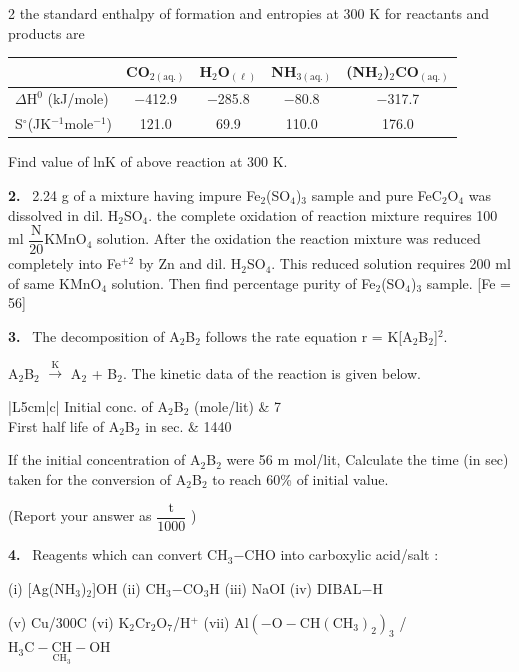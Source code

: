 \documentclass[10pt]{extarticle}
\newcommand{\qn}[1]{\par\smallskip\noindent\textbf{#1.}~}
\begin{document}
\begin{multicols}{2}
the standard enthalpy of formation and entropies at 300 K for reactants and products are\par
{\footnotesize\setlength{\tabcolsep}{2pt}\noindent\begin{tabular}{|l|c|c|c|c|}
\hline
 & CO$_{2(\text{aq.})}$ & H$_2$O$_{(\ell)}$ & NH$_{3(\text{aq.})}$ & (NH$_2$)$_2$CO$_{(\text{aq.})}$\\ \hline
$\Delta\text{H}^0$ (kJ/mole) & $-$412.9 & $-$285.8 & $-$80.8 & $-$317.7\\ \hline
S$^\circ$(JK$^{-1}$mole$^{-1}$) & 121.0 & 69.9 & 110.0 & 176.0\\ \hline
\end{tabular}}\par
Find value of lnK of above reaction at 300 K.
\qn{2} 2.24 g of a mixture having impure Fe$_2$(SO$_4$)$_3$ sample and pure FeC$_2$O$_4$ was dissolved in dil. H$_2$SO$_4$. the complete oxidation of reaction mixture requires 100 ml $\dfrac{\text{N}}{20}$KMnO$_4$ solution. After the oxidation the reaction mixture was reduced completely into Fe$^{+2}$ by Zn and dil. H$_2$SO$_4$. This reduced solution requires 200 ml of same KMnO$_4$ solution. Then find percentage purity of Fe$_2$(SO$_4$)$_3$ sample. [Fe = 56]
\qn{3} The decomposition of A$_2$B$_2$ follows the rate equation r = K[A$_2$B$_2$]$^2$.\par
A$_2$B$_2$ $\xrightarrow{\text{K}}$ A$_2$ + B$_2$. The kinetic data of the reaction is given below.\par
{\footnotesize\setlength{\tabcolsep}{2pt}\noindent\begin{tabular}{|L{5cm}|c|}
\hline
Initial conc. of A$_2$B$_2$ (mole/lit) & 7\\ \hline
First half life of A$_2$B$_2$ in sec. & 1440\\ \hline
\end{tabular}}\par
If the initial concentration of A$_2$B$_2$ were 56 m mol/lit, Calculate the time (in sec) taken for the conversion of A$_2$B$_2$ to reach 60\% of initial value.\par
(Report your answer as $\dfrac{\text{t}}{1000}$ )
\qn{4} Reagents which can convert CH$_3$$-$CHO into carboxylic acid/salt :\par
(i) [Ag(NH$_3$)$_2$]OH \quad (ii) CH$_3$$-$CO$_3$H \quad (iii) NaOI \quad (iv) DIBAL$-$H\par
(v) Cu/300\textdegree C \quad (vi) K$_2$Cr$_2$O$_7$/H$^+$ \quad (vii) Al$\left(-\text{O}-\text{CH}(\text{CH}_3)_2\right)_3$ / $\text{H}_3\text{C}-\underset{\text{CH}_3}{\text{CH}}-\text{OH}$

\end{multicols}
\end{document}
